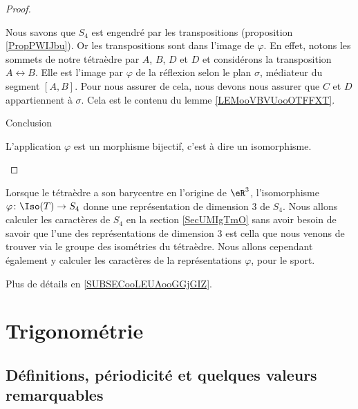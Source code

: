 \begin{proof}
\begin{subproof}
        Nous savons que \( S_4\) est engendré par les transpositions (proposition \ref{PropPWIJbu}). Or les transpositions sont dans l'image de \( \varphi\). En effet, notons les sommets de notre tétraèdre par \( A\), \( B\), \( D\) et \( D\) et considérons la transposition \( A\leftrightarrow B\). Elle est l'image par \( \varphi\) de la réflexion selon le plan \( \sigma\), médiateur du segment \( [A,B]\). Pour nous assurer de cela, nous devons nous assurer que \( C\) et \( D\) appartiennent à \( \sigma\). Cela est le contenu du lemme \ref{LEMooVBVUooOTFFXT}.

    \item[Conclusion]

        L'application \( \varphi\) est un morphisme bijectif, c'est à dire un isomorphisme.

    \end{subproof}
\end{proof}

\begin{normaltext}
    Lorsque le tétraèdre a son barycentre en l'origine de \( \eR^3\), l'isomorphisme \( \varphi\colon \Iso(T)\to S_4\) donne une représentation de dimension \( 3\) de \( S_4\). Nous allons calculer les caractères de \( S_4\) en la section \ref{SecUMIgTmO} sans avoir besoin de savoir que l'une des représentations de dimension \( 3\) est cella que nous venons de trouver via le groupe des isométries du tétraèdre. Nous allons cependant également y calculer les caractères de la représentations \( \varphi\), pour le sport.

    Plus de détails en \ref{SUBSECooLEUAooGGjGIZ}.
\end{normaltext}

\section{Trigonométrie}

\subsection{Définitions, périodicité et quelques valeurs remarquables}

